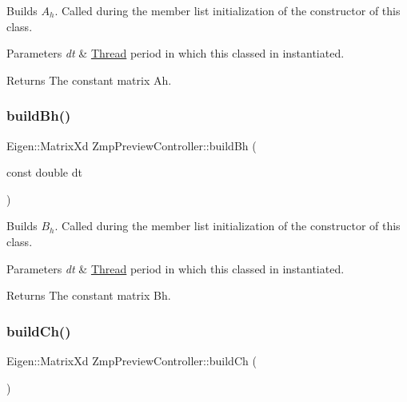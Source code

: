Builds $A_h$. Called during the member list initialization of the constructor of this class.


\begin{DoxyParams}{Parameters}
{\em dt} & \hyperlink{classThread}{Thread} period in which this classed in instantiated. \\
\hline
\end{DoxyParams}
\begin{DoxyReturn}{Returns}
The constant matrix Ah. 
\end{DoxyReturn}
\hypertarget{classZmpPreviewController_a0114a8bdba920b9a7fb6b35e7b90ddd1}{}\label{classZmpPreviewController_a0114a8bdba920b9a7fb6b35e7b90ddd1} 
\subsubsection{\texorpdfstring{build\+Bh()}{buildBh()}}
{\footnotesize\ttfamily Eigen\+::\+Matrix\+Xd Zmp\+Preview\+Controller\+::build\+Bh (\begin{DoxyParamCaption}\item[{const double}]{dt }\end{DoxyParamCaption})}

Builds $B_h$. Called during the member list initialization of the constructor of this class.


\begin{DoxyParams}{Parameters}
{\em dt} & \hyperlink{classThread}{Thread} period in which this classed in instantiated. \\
\hline
\end{DoxyParams}
\begin{DoxyReturn}{Returns}
The constant matrix Bh. 
\end{DoxyReturn}
\hypertarget{classZmpPreviewController_a58723464a66fc3a1122c613500bb2052}{}\label{classZmpPreviewController_a58723464a66fc3a1122c613500bb2052} 
\subsubsection{\texorpdfstring{build\+Ch()}{buildCh()}}
{\footnotesize\ttfamily Eigen\+::\+Matrix\+Xd Zmp\+Preview\+Controller\+::build\+Ch (\begin{DoxyParamCaption}{ }\end{DoxyParamCaption})}

